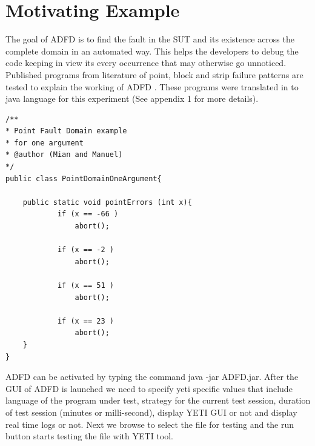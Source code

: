 \documentclass{acm_proc_article-sp}
\begin{document}




\section{Motivating Example}\label{sec:example}
The goal of ADFD is to find the fault in the SUT and its existence across the complete domain in an automated way. This helps the developers to debug the code keeping in view its every occurrence that may otherwise go unnoticed.
Published programs from literature \cite{Chen2003}\cite{Chan1996}\cite{Chen2004} of point, block and strip failure patterns are tested to explain the working of ADFD . These programs were translated in to java language for this experiment (See appendix 1 for more details). \\

\begin{lstlisting}
/**
* Point Fault Domain example 
* for one argument
* @author (Mian and Manuel)
*/
public class PointDomainOneArgument{

	public static void pointErrors (int x){
     		if (x == -66 )
       			abort();
     
     		if (x == -2 )
     			abort();
     
     		if (x == 51 )
     			abort();
     
     		if (x == 23 )
     			abort();
	}
}
\end{lstlisting}

ADFD can be activated by typing the command java -jar ADFD.jar. After the GUI of ADFD is launched we need to specify yeti specific values that include language of the program under test, strategy for the current test session, duration of test session (minutes or milli-second), display YETI GUI or not and display real time logs or not. Next we browse to select the file for testing and the run button starts testing the file with YETI tool. 
\end{document}
